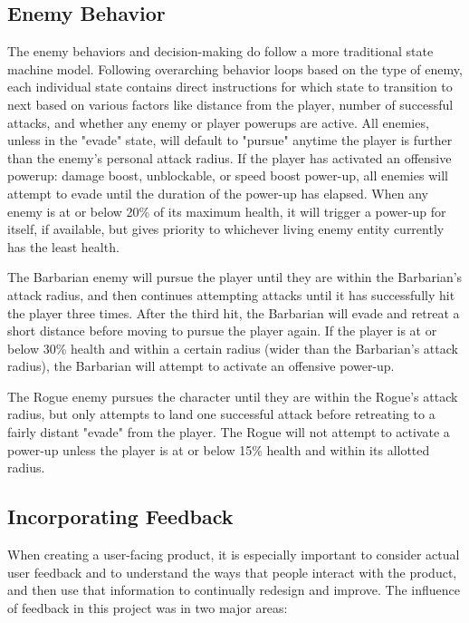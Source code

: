 \documentclass[10pt,twocolumn]{article}
\begin{document}
\subsection{Enemy Behavior}
The enemy behaviors and decision-making do follow a more traditional state machine model. Following overarching behavior loops based on the type of enemy, each individual state contains direct instructions for which state to transition to next based on various factors like distance from the player, number of successful attacks, and whether any enemy or player powerups are active. All enemies, unless in the "evade" state, will default to "pursue" anytime the player is further than the enemy's personal attack radius. If the player has activated an offensive powerup:  damage boost, unblockable, or speed boost power-up, all enemies will attempt to evade until the duration of the power-up has elapsed. When any enemy is at or below 20\% of its maximum health, it will trigger a power-up for itself, if available, but gives priority to whichever living enemy entity currently has the least health. 

The Barbarian enemy will pursue the player until they are within the Barbarian's attack radius, and then continues attempting attacks until it has successfully hit the player three times. After the third hit, the Barbarian will evade and retreat a short distance before moving to pursue the player again. If the player is at or below 30\% health and within a certain radius (wider than the Barbarian's attack radius), the Barbarian will attempt to activate an offensive power-up. 

The Rogue enemy pursues the character until they are within the Rogue's attack radius, but only attempts to land one successful attack before retreating to a fairly distant "evade" from the player. The Rogue will not attempt to activate a power-up unless the player is at or below 15\% health and within its allotted radius.


\subsection{Incorporating Feedback}

When creating a user-facing product, it is especially important to consider actual user feedback and to understand the ways that people interact with the product, and then use that information to continually redesign and improve. The influence of feedback in this project was in two major areas: 
\end{document}
